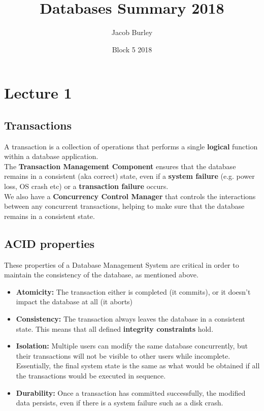 \documentclass{article}
\title{Databases Summary 2018}
\author{Jacob Burley}
\date{Block 5 2018}
\begin{document}
\long{}
\maketitle

\section*{Lecture 1}
\subsection*{Transactions}
A transaction is a collection of operations that performs a single \textbf{logical} function within a database application.
\\The \textbf{Transaction Management Component} ensures that the database remains in a consistent (aka correct) state, even if a \textbf{system failure} (e.g. power loss, OS crash etc) or a \textbf{transaction failure} occurs.
\\We also have a \textbf{Concurrency Control Manager} that controls the interactions between any concurrent transactions, helping to make sure that the database remains in a consistent state.

\subsection*{ACID properties}
These properties of a Database Management System are critical in order to maintain the consistency of the database, as mentioned above.
\begin{itemize}
    \item \textbf{Atomicity:} The transaction either is completed (it commits), or it doesn't impact the database at all (it aborts)
    \item \textbf{Consistency:} The transaction always leaves the database in a consistent state. This means that all defined \textbf{integrity constraints} hold.
    \item \textbf{Isolation:} Multiple users can modify the same database concurrently, but their transactions will not be visible to other users while incomplete. Essentially, the final system state is the same as what would be obtained if all the transactions would be executed in sequence.
    \item \textbf{Durability:} Once a transaction has committed successfully, the modified data persists, even if there is a system failure such as a disk crash.
\end{itemize}
\newpage    
\end{document}
